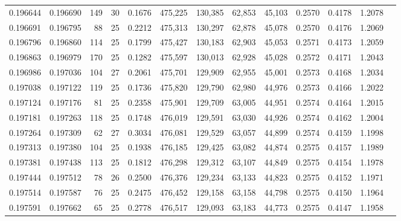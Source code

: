 \begin{tabular}{rrrrrrrrrrrrr}
0.196644 & 0.196690 & 149 &  30 &                                     0.1676 & 475,225 & 130,385 &  62,853 &  45,103 & 0.2570 & 0.4178 & 1.2078 \\
0.196691 & 0.196795 &  88 &  25 &                                     0.2212 & 475,313 & 130,297 &  62,878 &  45,078 & 0.2570 & 0.4176 & 1.2069 \\
0.196796 & 0.196860 & 114 &  25 &                                     0.1799 & 475,427 & 130,183 &  62,903 &  45,053 & 0.2571 & 0.4173 & 1.2059 \\
0.196863 & 0.196979 & 170 &  25 &                                     0.1282 & 475,597 & 130,013 &  62,928 &  45,028 & 0.2572 & 0.4171 & 1.2043 \\
0.196986 & 0.197036 & 104 &  27 &                                     0.2061 & 475,701 & 129,909 &  62,955 &  45,001 & 0.2573 & 0.4168 & 1.2034 \\
0.197038 & 0.197122 & 119 &  25 &                                     0.1736 & 475,820 & 129,790 &  62,980 &  44,976 & 0.2573 & 0.4166 & 1.2022 \\
0.197124 & 0.197176 &  81 &  25 &                                     0.2358 & 475,901 & 129,709 &  63,005 &  44,951 & 0.2574 & 0.4164 & 1.2015 \\
0.197181 & 0.197263 & 118 &  25 &                                     0.1748 & 476,019 & 129,591 &  63,030 &  44,926 & 0.2574 & 0.4162 & 1.2004 \\
0.197264 & 0.197309 &  62 &  27 &                                     0.3034 & 476,081 & 129,529 &  63,057 &  44,899 & 0.2574 & 0.4159 & 1.1998 \\
0.197313 & 0.197380 & 104 &  25 &                                     0.1938 & 476,185 & 129,425 &  63,082 &  44,874 & 0.2575 & 0.4157 & 1.1989 \\
0.197381 & 0.197438 & 113 &  25 &                                     0.1812 & 476,298 & 129,312 &  63,107 &  44,849 & 0.2575 & 0.4154 & 1.1978 \\
0.197444 & 0.197512 &  78 &  26 &                                     0.2500 & 476,376 & 129,234 &  63,133 &  44,823 & 0.2575 & 0.4152 & 1.1971 \\
0.197514 & 0.197587 &  76 &  25 &                                     0.2475 & 476,452 & 129,158 &  63,158 &  44,798 & 0.2575 & 0.4150 & 1.1964 \\
0.197591 & 0.197662 &  65 &  25 &                                     0.2778 & 476,517 & 129,093 &  63,183 &  44,773 & 0.2575 & 0.4147 & 1.1958 \\

\end{tabular}
